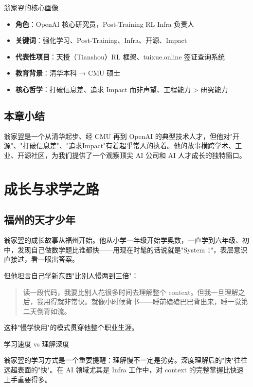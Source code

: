 \documentclass[a4paper]{article}
\begin{document}
\begin{importantbox}{翁家翌的核心画像}

\begin{itemize}
\item \textbf{角色}：OpenAI 核心研究员，Post-Training RL Infra 负责人
\item \textbf{关键词}：强化学习、Post-Training、Infra、开源、Impact
\item \textbf{代表性项目}：天授（Tianshou）RL 框架、tuixue.online 签证查询系统
\item \textbf{教育背景}：清华本科 → CMU 硕士
\item \textbf{核心哲学}：打破信息差、追求 Impact 而非声望、工程能力 > 研究能力
\end{itemize}
\end{importantbox}


\subsection{本章小结}
翁家翌是一个从清华起步、经 CMU 再到 OpenAI 的典型技术人才，但他对"开源"、"打破信息差"、"追求Impact"有着超乎常人的执着。他的故事横跨学术、工业、开源社区，为我们提供了一个观察顶尖 AI 公司和 AI 人才成长的独特窗口。

\section{成长与求学之路}

\subsection{福州的天才少年}

翁家翌的成长故事从福州开始。他从小学一年级开始学奥数，一直学到六年级、初中，发现自己做数学题比谁都快——用现在时髦的话说就是"System 1"，表层意识直接过，看一眼出答案。

但他坦言自己学新东西"比别人慢两到三倍"：

\begin{quote}
读一段代码，我要比别人花很多时间去理解整个 context。但我一旦理解之后，我用得就非常快。就像小时候背书——睡前磕磕巴巴背出来，睡一觉第二天倒背如流。
\end{quote}

这种"慢学快用"的模式贯穿他整个职业生涯。

\begin{warningbox}{学习速度 vs 理解深度}

翁家翌的学习方式是一个重要提醒：理解慢不一定是劣势。深度理解后的"快"往往远超表面的"快"。在 AI 领域尤其是 Infra 工作中，对 context 的完整掌握比快速上手重要得多。
\end{warningbox}
\end{document}
